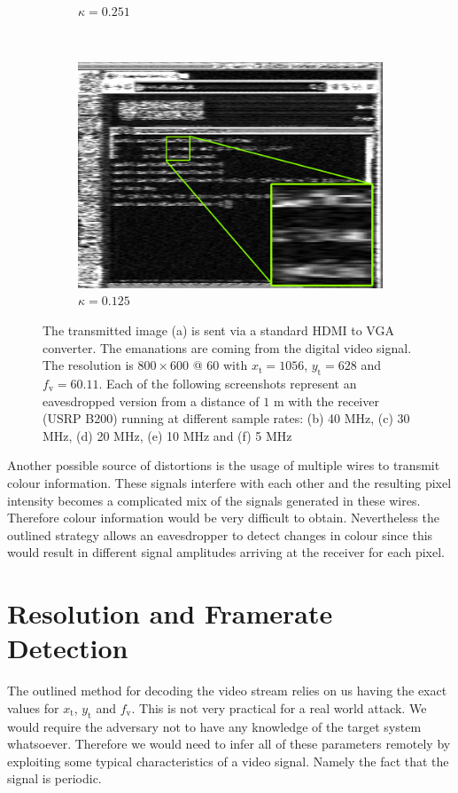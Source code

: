 \documentclass[a4paper,12pt,twoside,openright]{report}
\begin{document}
\begin{figure}[p!]
\begin{subfigure}[b]{0.45\textwidth}
  \caption{$\kappa = 0.251$}
\end{subfigure} ~
\begin{subfigure}[b]{0.45\textwidth}
  \includegraphics[width=\textwidth]{sr_5MHz_at_190MHz}
  \caption{$\kappa = 0.125$}
\end{subfigure}
\caption{The transmitted image (a) is sent via a standard HDMI to VGA converter. The emanations are coming from the digital video signal. The resolution is $800 \times 600 $ @ $ 60$ with $x_\text{t} = 1056$, $y_\text{t} = 628$ and $f_\text{v} = 60.11$. Each of the following screenshots represent an eavesdropped version from a distance of $1$ m with the receiver (USRP B200) running at different sample rates: (b) 40 MHz, (c) 30 MHz, (d) 20 MHz, (e) 10 MHz and (f) 5 MHz}
\label{fig:samplerates}
\end{figure}

Another possible source of distortions is the usage of multiple wires to transmit colour information. These signals interfere with each other and the resulting pixel intensity becomes a complicated mix of the signals generated in these wires. Therefore colour information would be very difficult to obtain. Nevertheless the outlined strategy allows an eavesdropper to detect changes in colour since this would result in different signal amplitudes arriving at the receiver for each pixel.

\section{Resolution and Framerate Detection}

The outlined method for decoding the video stream relies on us having the exact values for $x_\text{t}$, $y_\text{t}$ and $f_\text{v}$. This is not very practical for a real world attack. We would require the adversary not to have any knowledge of the target system whatsoever. Therefore we would need to infer all of these parameters remotely by exploiting some typical characteristics of a video signal. Namely the fact that the signal is periodic.
\end{document}
